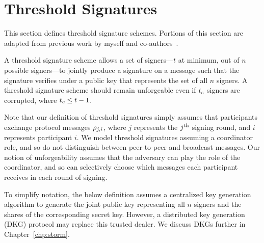 \section{Threshold Signatures}
\label{threshold-sig-background}

This section defines threshold signature schemes.
Portions of this section are adapted from previous work by myself and co-authors~\cite{CritesKM23}.

A threshold signature scheme allows a set of signers---$t$ at minimum, out of $n$ possible signers---to jointly
produce a signature on a message such that the signature verifies under a public key that
represents the set of all $n$ signers.
A threshold signature scheme should remain unforgeable even if $t_c$ signers are corrupted,
where $t_c \leq t-1$.

Note that our definition of threshold signatures simply assumes that
participants exchange protocol messages $ \rho_{ j, i}$,
where $j$ represents the $j^{\textrm{\scriptsize th}}$ signing round,
and $i$ represents participant $i$.
We model threshold signatures assuming a coordinator role,
and so do not distinguish between peer-to-peer and broadcast messages.
Our notion of unforgeability assumes that the adversary can play the role of the coordinator,
and so can selectively choose which messages each participant receives in each round of signing.

To simplify notation,
the below definition assumes a centralized key generation algorithm to generate the joint public key representing all $n$ signers and the shares of the corresponding secret key.
However, a distributed key generation (DKG) protocol may replace this trusted dealer.
We discuss DKGs further in Chapter~\ref{chp:storm}.


